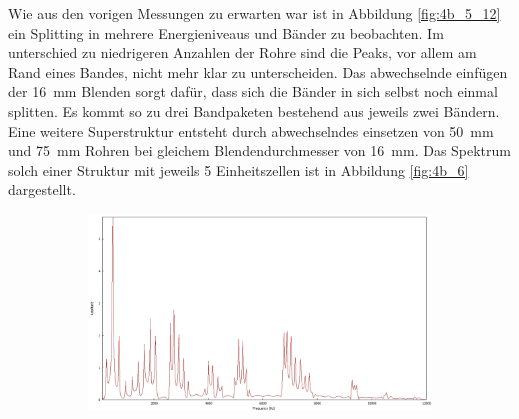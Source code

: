 Wie aus den vorigen Messungen zu erwarten war ist in Abbildung \ref{fig:4b_5_12} ein Splitting in mehrere Energieniveaus und Bänder zu beobachten. 
Im unterschied zu niedrigeren Anzahlen der Rohre sind die Peaks, vor allem am Rand eines Bandes, nicht mehr klar zu unterscheiden.
Das abwechselnde einfügen der 16~mm Blenden sorgt dafür, dass sich die Bänder in sich selbst noch einmal splitten. 
Es kommt so zu drei Bandpaketen bestehend aus jeweils zwei Bändern.
Eine weitere Superstruktur entsteht durch abwechselndes einsetzen von 50~mm und 75~mm Rohren bei gleichem Blendendurchmesser von 16~mm. Das Spektrum solch einer Struktur mit jeweils 5 Einheitszellen ist in Abbildung \ref{fig:4b_6} dargestellt.
\begin{figure}
\centering
\begin{subfigure}{0.65\textwidth}
\includegraphics[width=\textwidth]{content/messungen/Chapter4b/4b_6.jpg}
\end{subfigure}
\begin{subfigure}{0.34\textwidth}

\end{subfigure}
\end{figure}
